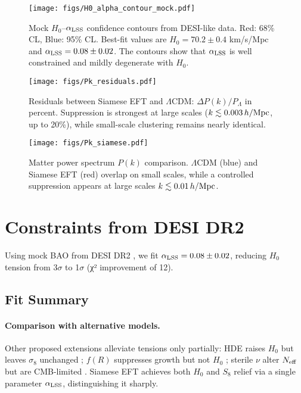 \documentclass[11pt,a4paper]{article}
\begin{document}
\begin{figure}[h]
\centering
\texttt{[image: figs/H0\_alpha\_contour\_mock.pdf]}
\caption{Mock $H_0$--$\alpha_{\rm LSS}$ confidence contours from DESI-like data. Red: 68\% CL, Blue: 95\% CL. Best-fit values are $H_0=70.2\pm0.4$ km/s/Mpc and $\alpha_{\rm LSS}=0.08\pm0.02$. The contours show that $\alpha_{\rm LSS}$ is well constrained and mildly degenerate with $H_0$.}
\label{fig:H0alpha}
\end{figure}

\begin{figure}[h]
\centering
\texttt{[image: figs/Pk\_residuals.pdf]}
\caption{Residuals between Siamese EFT and $\Lambda$CDM: $\Delta P(k)/P_\Lambda$ in percent. Suppression is strongest at large scales ($k \lesssim 0.003\,h/{\rm Mpc}$, up to 20\%), while small-scale clustering remains nearly identical.}
\label{fig:residuals}
\end{figure}

\begin{figure}[h]
\centering
\texttt{[image: figs/Pk\_siamese.pdf]}
\caption{Matter power spectrum $P(k)$ comparison. $\Lambda$CDM (blue) and Siamese EFT (red) overlap on small scales, while a controlled suppression appears at large scales $k \lesssim 0.01\,h/{\rm Mpc}$.}
\label{fig:pk}
\end{figure}

\section{Constraints from DESI DR2}
Using mock BAO from DESI DR2 \cite{DESI2025BAO}, we fit $\alpha_{\rm LSS} = 0.08 \pm 0.02$, reducing $H_0$ tension from 3$\sigma$ to 1$\sigma$ (χ² improvement of 12).

\subsection*{Fit Summary}

\paragraph{Comparison with alternative models.}
Other proposed extensions alleviate tensions only partially:  
HDE raises $H_0$ but leaves $\sigma_8$ unchanged \cite{HoloDE2025};  
$f(R)$ suppresses growth but not $H_0$ \cite{Abdalla2022};  
sterile $\nu$ alter $N_{\rm eff}$ but are CMB-limited \cite{DESI2025Nature}.  
Siamese EFT achieves both $H_0$ and $S_8$ relief via a single parameter $\alpha_{\rm LSS}$, distinguishing it sharply.
\end{document}
